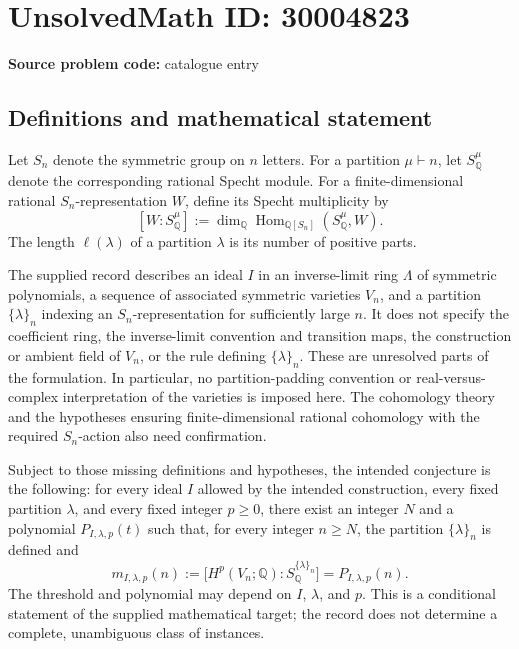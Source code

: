 \documentclass[11pt]{article}
\newcommand{\Q}{\mathbb{Q}}
\begin{document}
\section*{UnsolvedMath ID: 30004823}
\textbf{Source problem code:} catalogue entry
\subsection{Definitions and mathematical statement}
Let \(S_n\) denote the symmetric group on \(n\) letters. For a partition \(\mu\vdash n\), let \(S^{\mu}_{\Q}\) denote the corresponding rational Specht module. For a finite-dimensional rational \(S_n\)-representation \(W\), define its Specht multiplicity by
\[
[W:S^{\mu}_{\Q}]
:=\dim_{\Q}\operatorname{Hom}_{\Q[S_n]}(S^{\mu}_{\Q},W).
\]
The length \(\ell(\lambda)\) of a partition \(\lambda\) is its number of positive parts.

The supplied record describes an ideal \(I\) in an inverse-limit ring \(\Lambda\) of symmetric polynomials, a sequence of associated symmetric varieties \(V_n\), and a partition \(\{\lambda\}_n\) indexing an \(S_n\)-representation for sufficiently large \(n\). It does not specify the coefficient ring, the inverse-limit convention and transition maps, the construction or ambient field of \(V_n\), or the rule defining \(\{\lambda\}_n\). These are unresolved parts of the formulation. In particular, no partition-padding convention or real-versus-complex interpretation of the varieties is imposed here. The cohomology theory and the hypotheses ensuring finite-dimensional rational cohomology with the required \(S_n\)-action also need confirmation.

Subject to those missing definitions and hypotheses, the intended conjecture is the following: for every ideal \(I\) allowed by the intended construction, every fixed partition \(\lambda\), and every fixed integer \(p\geq 0\), there exist an integer \(N\) and a polynomial \(P_{I,\lambda,p}(t)\) such that, for every integer \(n\geq N\), the partition \(\{\lambda\}_n\) is defined and
\[
m_{I,\lambda,p}(n)
:=\bigl[H^p(V_n;\Q):S^{\{\lambda\}_n}_{\Q}\bigr]
=P_{I,\lambda,p}(n).
\]
The threshold and polynomial may depend on \(I\), \(\lambda\), and \(p\). This is a conditional statement of the supplied mathematical target; the record does not determine a complete, unambiguous class of instances.
\end{document}
